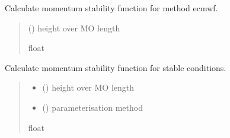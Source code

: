 \documentclass[letterpaper,10pt,english]{sphinxmanual}
\begin{document}
\begin{fulllineitems}

\pysigstartsignatures
{}
\pysigstopsignatures
\sphinxAtStartPar
Calculate momentum stability function for method ecmwf.
\begin{quote}\begin{description}
\sphinxAtStartPar
{} () \textendash{} height over MO length

\sphinxAtStartPar
{}

\sphinxAtStartPar
float

\end{description}\end{quote}

\end{fulllineitems}



\begin{fulllineitems}

\pysigstartsignatures
{}
\pysigstopsignatures
\sphinxAtStartPar
Calculate momentum stability function for stable conditions.
\begin{quote}\begin{description}
\begin{itemize}
\item {} 
\sphinxAtStartPar
{} () \textendash{} height over MO length

\item {} 
\sphinxAtStartPar
{} () \textendash{} parameterisation method

\end{itemize}

\sphinxAtStartPar
{}

\sphinxAtStartPar
float

\end{description}\end{quote}

\end{fulllineitems}
\end{document}
